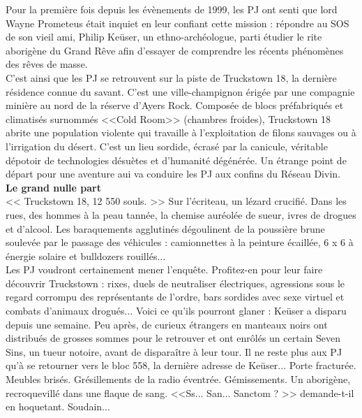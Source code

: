 \documentclass[11pt,twoside,a4paper]{book}
\begin{document}
Pour la premi{\`e}re fois depuis les {\'e}v{\`e}nements de 1999, les PJ ont senti que lord Wayne Prometeus {\'e}tait inquiet en leur confiant cette mission : r{\'e}pondre au SOS de son vieil ami, Philip Ke{\"u}ser, un ethno-arch{\'e}ologue, parti {\'e}tudier le rite aborig{\`e}ne du Grand R{\^e}ve afin d'essayer de comprendre les r{\'e}cents ph{\'e}nom{\`e}nes des r{\^e}ves de masse.~\\

C'est ainsi que les PJ se retrouvent sur la piste de Truckstown 18, la derni{\`e}re r{\'e}sidence connue du savant. C'est une ville-champignon {\'e}rig{\'e}e par une compagnie mini{\`e}re au nord de la r{\'e}serve d'Ayers Rock. Compos{\'e}e de blocs pr{\'e}fabriqu{\'e}s et climatis{\'e}s surnomm{\'e}s <<Cold Room>> (chambres froides), Truckstown 18 abrite une population violente qui travaille {\`a} l'exploitation de filons sauvages ou {\`a} l'irrigation du d{\'e}sert. C'est un lieu sordide, {\'e}cras{\'e} par la canicule, v{\'e}ritable d{\'e}potoir de technologies d{\'e}su{\`e}tes et d'humanit{\'e} d{\'e}g{\'e}n{\'e}r{\'e}e. Un {\'e}trange point de d{\'e}part pour une aventure aui va conduire les PJ aux confins du R{\'e}seau Divin.~\\

\textbf{\large Le grand nulle part}~\\

<< Truckstown 18, 12 550 souls. >> Sur l'{\'e}criteau, un l{\'e}zard crucifi{\'e}. Dans les rues, des hommes {\`a} la peau tann{\'e}e, la chemise aur{\'e}ol{\'e}e de sueur, ivres de drogues et d'alcool. Les baraquements agglutin{\'e}s d{\'e}goulinent de la poussi{\`e}re brune soulev{\'e}e par le passage des v{\'e}hicules : camionnettes {\`a} la peinture {\'e}caill{\'e}e, 6 x 6 {\`a} {\'e}nergie solaire et bulldozers rouill{\'e}s...~\\

Les PJ voudront certainement mener l'enqu{\^e}te. Profitez-en pour leur faire d{\'e}couvrir Truckstown : rixes, duels de neutraliser {\'e}lectriques, agressions sous le regard corrompu des repr{\'e}sentants de l'ordre, bars sordides avec sexe virtuel et combats d'animaux drogu{\'e}s... Voici ce qu'ils pourront glaner : Ke{\"u}ser a disparu depuis une semaine. Peu apr{\`e}s, de curieux {\'e}trangers en manteaux noirs ont distribu{\'e}s de grosses sommes pour le retrouver et ont enr{\^o}l{\'e}s un certain Seven Sins, un tueur notoire, avant de dispara{\^i}tre {\`a} leur tour. Il ne reste plus aux PJ qu'{\`a} se retourner vers le bloc 558, la derni{\`e}re adresse de Ke{\"u}ser... Porte fractur{\'e}e. Meubles bris{\'e}s. Gr{\'e}sillements de la radio {\'e}ventr{\'e}e. G{\'e}missements. Un aborig{\`e}ne, recroquevill{\'e} dans une flaque de sang. <<Ss... San... Sanctom ? >> demande-t-il en hoquetant. Soudain... ~\\
\end{document}
